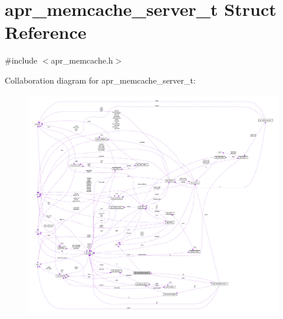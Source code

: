 \hypertarget{structapr__memcache__server__t}{}\section{apr\+\_\+memcache\+\_\+server\+\_\+t Struct Reference}
\label{structapr__memcache__server__t}


{\ttfamily \#include $<$apr\+\_\+memcache.\+h$>$}



Collaboration diagram for apr\+\_\+memcache\+\_\+server\+\_\+t\+:
\nopagebreak
\begin{figure}[H]
\begin{center}
\leavevmode
\includegraphics[width=350pt]{structapr__memcache__server__t__coll__graph}
\end{center}
\end{figure}
